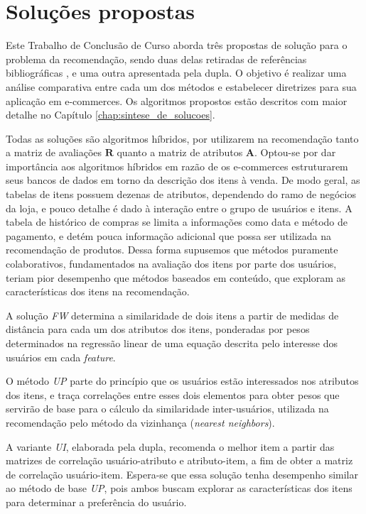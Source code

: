 
\section{Soluções propostas} %
\label{sec:solu_es_propostas}

Este Trabalho de Conclusão de Curso aborda três propostas de solução para o problema da recomendação, sendo duas delas retiradas de referências bibliográficas \cite{symeonidis2007feature,debnath2008feature}, e uma outra apresentada pela dupla. O objetivo é realizar uma análise comparativa entre cada um dos métodos e estabelecer diretrizes para sua aplicação em e-commerces. Os algoritmos propostos estão descritos com maior detalhe no Capítulo \ref{chap:sintese_de_solucoes}.

Todas as soluções são algoritmos híbridos, por utilizarem na recomendação tanto a matriz de avaliações $\mathbf{R}$ quanto a matriz de atributos $\mathbf{A}$. Optou-se por dar importância aos algoritmos híbridos em razão de os e-commerces estruturarem seus bancos de dados em torno da descrição dos itens à venda. De modo geral, as tabelas de itens possuem dezenas de atributos, dependendo do ramo de negócios da loja, e pouco detalhe é dado à interação entre o grupo de usuários e itens. A tabela de histórico de compras se limita a informações como data e método de pagamento, e detém pouca informação adicional que possa ser utilizada na recomendação de produtos. Dessa forma supusemos que métodos puramente colaborativos, fundamentados na avaliação dos itens por parte dos usuários, teriam pior desempenho que métodos baseados em conteúdo, que exploram as características dos itens na recomendação. 

A solução \textit{FW} determina a similaridade de dois itens a partir de medidas de distância para cada um dos atributos dos itens, ponderadas por pesos determinados na regressão linear de uma equação descrita pelo interesse dos usuários em cada \textit{feature}.

O método \textit{UP} parte do princípio que os usuários estão interessados nos atributos dos itens, e traça correlações entre esses dois elementos para obter pesos que servirão de base para o cálculo da similaridade inter-usuários, utilizada na recomendação pelo método da vizinhança (\textit{nearest neighbors}). 

A variante \textit{UI}, elaborada pela dupla, recomenda o melhor item a partir das matrizes de correlação usuário-atributo e atributo-item, a fim de obter a matriz de correlação usuário-item. Espera-se que essa solução tenha desempenho similar ao método de base \textit{UP}, pois ambos buscam explorar as características dos itens para determinar a preferência do usuário.

